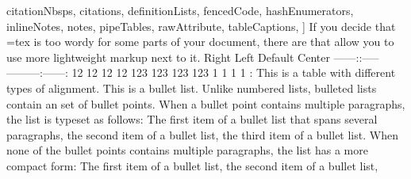 \markdownRendererDocumentBegin
citationNbsps, citations, definitionLists, fencedCode, hashEnumerators, inlineNotes, notes, pipeTables, rawAttribute, tableCaptions, ]\markdownRendererInterblockSeparator
{}If you decide that \markdownRendererLeftBrace{}=tex\markdownRendererRightBrace{} is too wordy for some parts of your document, there are  that allow you to use more lightweight markup next to it.\markdownRendererInterblockSeparator
{}\markdownRendererInterblockSeparator
{}\markdownRendererPipe{} Right \markdownRendererPipe{} Left \markdownRendererPipe{} Default \markdownRendererPipe{} Center \markdownRendererPipe{} \markdownRendererPipe{}------:\markdownRendererPipe{}:-----\markdownRendererPipe{}---------\markdownRendererPipe{}:------:\markdownRendererPipe{} \markdownRendererPipe{} 12 \markdownRendererPipe{} 12 \markdownRendererPipe{} 12 \markdownRendererPipe{} 12 \markdownRendererPipe{} \markdownRendererPipe{} 123 \markdownRendererPipe{} 123 \markdownRendererPipe{} 123 \markdownRendererPipe{} 123 \markdownRendererPipe{} \markdownRendererPipe{} 1 \markdownRendererPipe{} 1 \markdownRendererPipe{} 1 \markdownRendererPipe{} 1 \markdownRendererPipe{}\markdownRendererInterblockSeparator
{}: This is a table with different types of alignment.\markdownRendererInterblockSeparator
{}This is a bullet list. Unlike numbered lists, bulleted lists contain an  set of bullet points. When a bullet point contains multiple paragraphs, the list is typeset as follows:\markdownRendererInterblockSeparator
{}\markdownRendererUlBegin
\markdownRendererUlItem The first item of a bullet list\markdownRendererInterblockSeparator
{}that spans several paragraphs,\markdownRendererUlItemEnd 
\markdownRendererUlItem the second item of a bullet list,\markdownRendererUlItemEnd 
\markdownRendererUlItem the third item of a bullet list.\markdownRendererUlItemEnd 
\markdownRendererUlEnd \markdownRendererInterblockSeparator
{}When none of the bullet points contains multiple paragraphs, the list has a more compact form:\markdownRendererInterblockSeparator
{}\markdownRendererUlBeginTight
\markdownRendererUlItem The first item of a bullet list,\markdownRendererUlItemEnd 
\markdownRendererUlItem the second item of a bullet list,\markdownRendererUlItemEnd 

